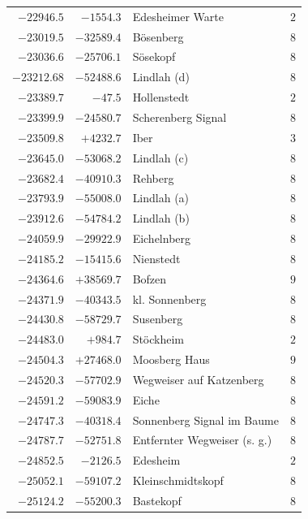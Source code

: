 \begin{center}
\begin{tabular}{r|r|p{170pt}|r}
\(-22946.5\)&\(-1554.3\)&Edesheimer Warte&\(2\)\\
\(-23019.5\)&\(-32589.4\)&Bösenberg&\(8\)\\
\(-23036.6\)&\(-25706.1\)&Sösekopf&\(8\)\\
\(-23212.68\)&\(-52488.6\)&Lindlah (d)&\(8\)\\
\(-23389.7\)&\(-47.5\)&Hollenstedt&\(2\)\\
\(-23399.9\)&\(-24580.7\)&Scherenberg Signal&\(8\)\\
\(-23509.8\)&\(+4232.7\)&Iber&\(3\)\\
\(-23645.0\)&\(-53068.2\)&Lindlah (c)&\(8\)\\
\(-23682.4\)&\(-40910.3\)&Rehberg&\(8\)\\
\(-23793.9\)&\(-55008.0\)&Lindlah (a)&\(8\)\\
\(-23912.6\)&\(-54784.2\)&Lindlah (b)&\(8\)\\
\(-24059.9\)&\(-29922.9\)&Eichelnberg&\(8\)\\
\(-24185.2\)&\(-15415.6\)&Nienstedt&\(8\)\\
\(-24364.6\)&\(+38569.7\)&Bofzen&\(9\)\\
\(-24371.9\)&\(-40343.5\)&kl. Sonnenberg&\(8\)\\
\(-24430.8\)&\(-58729.7\)&Susenberg&\(8\)\\
\(-24483.0\)&\(+984.7\)&Stöckheim&\(2\)\\
\(-24504.3\)&\(+27468.0\)&Moosberg Haus&\(9\)\\
\(-24520.3\)&\(-57702.9\)&Wegweiser auf Katzenberg&\(8\)\\
\(-24591.2\)&\(-59083.9\)&Eiche&\(8\)\\
\(-24747.3\)&\(-40318.4\)&Sonnenberg Signal im Baume&\(8\)\\
\(-24787.7\)&\(-52751.8\)&Entfernter Wegweiser (s. g.)&\(8\)\\
\(-24852.5\)&\(-2126.5\)&Edesheim&\(2\)\\
\(-25052.1\)&\(-59107.2\)&Kleinschmidtskopf&\(8\)\\
\(-25124.2\)&\(-55200.3\)&Bastekopf&\(8\)\\
\hline\end{tabular}\endgroup\end{center}
\clearpage
